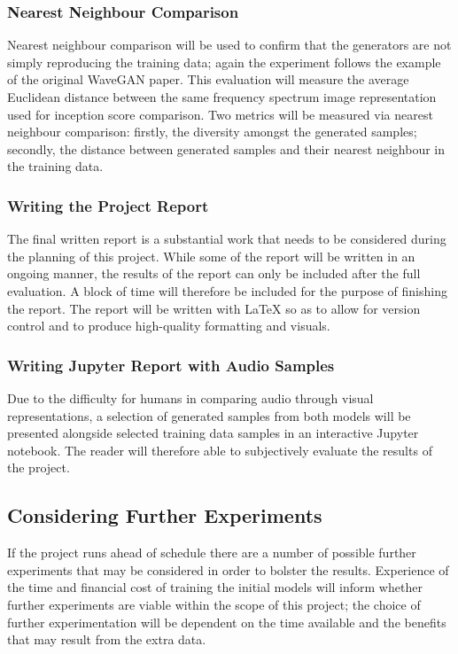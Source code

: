 \documentclass[a4paper, dvipsnames, titlepage]{article}
\begin{document}
\subsubsection{Nearest Neighbour Comparison}

Nearest neighbour comparison will be used to confirm that the generators are not simply reproducing the training data; again the experiment follows the example of the original WaveGAN paper.
This evaluation will measure the average Euclidean distance between the same frequency spectrum image representation used for inception score comparison.
Two metrics will be measured via nearest neighbour comparison: firstly, the diversity amongst the generated samples; secondly, the distance between generated samples and their nearest neighbour in the training data.

\subsubsection{Writing the Project Report}

The final written report is a substantial work that needs to be considered during the planning of this project.
While some of the report will be written in an ongoing manner, the results of the report can only be included after the full evaluation.
A block of time will therefore be included for the purpose of finishing the report.
The report will be written with LaTeX so as to allow for version control and to produce high-quality formatting and visuals. 

\subsubsection{Writing Jupyter Report with Audio Samples}

Due to the difficulty for humans in comparing audio through visual representations, a selection of generated samples from both models will be presented alongside selected training data samples in an interactive Jupyter notebook.
The reader will therefore able to subjectively evaluate the results of the project.

\subsection{Considering Further Experiments}

If the project runs ahead of schedule there are a number of possible further experiments that may be considered in order to bolster the results.
Experience of the time and financial cost of training the initial models will inform whether further experiments are viable within the scope of this project; the choice of further experimentation will be dependent on the time available and the benefits that may result from the extra data.
\end{document}
